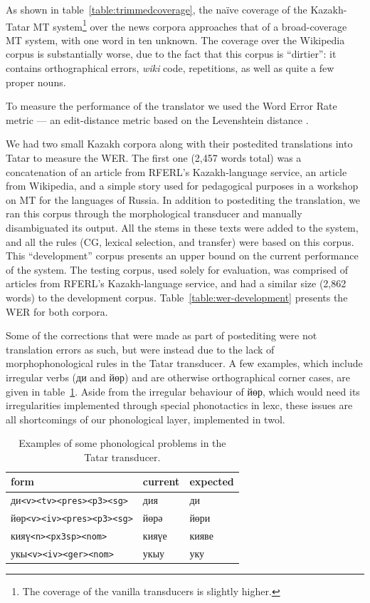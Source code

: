 \documentclass[a4paper,11pt]{article}
\newcommand{\tag}[1]{{\small{\texttt{#1}}}}
\begin{document}
As shown in table~\ref{table:trimmedcoverage}, the naïve coverage of the Kazakh-Tatar MT 
system\footnote{The coverage of the vanilla transducers is slightly higher.} over 
the news corpora approaches that of a broad-coverage MT system, with one word in ten unknown.
The coverage over the Wikipedia corpus 
is substantially worse, due to the fact that this corpus is ``dirtier'': it contains orthographical errors, \emph{wiki} code, repetitions, as well as quite a few proper nouns.

To measure the performance of the translator we used the Word Error Rate metric --- an edit-distance metric based on the
Levenshtein distance \citep{levenshtein/1966}.

We had two small Kazakh corpora along with their postedited translations into Tatar to measure the WER.
The first one (2,457 words total) was a concatenation of an article from RFERL's
Kazakh-language service, an article from Wikipedia, and a simple story used for pedagogical purposes in a workshop
on MT for the languages of Russia. In addition to postediting the translation, we ran this corpus through the
morphological transducer and manually disambiguated its output.  All the stems in these texts were added to
the system, and all the rules (CG, lexical selection, and transfer) were based on this corpus.
This ``development'' corpus presents an upper bound on the current performance
of the system. %
The testing corpus, used solely for evaluation, was comprised of articles from RFERL's Kazakh-language service, and had a similar size (2,862 words) to the development corpus.
Table~\ref{table:wer-development} presents the WER for both corpora. %

Some of the corrections that were made as part of postediting were not translation errors as such, but were instead due to the lack of morphophonological rules in the Tatar transducer.  A few examples, which include irregular verbs (ди and йөр) and are otherwise orthographical corner cases, are given in table~\ref{tab:phonerrors}.  Aside from the irregular behaviour of йөр, which would need its irregularities implemented through special phonotactics in lexc, these issues are all shortcomings of our phonological layer, implemented in twol.

\begin{table}
	\centering
	\begin{tabular}{lll}
		\toprule
		form & current & expected \\\midrule
		ди\tag{<v>}\tag{<tv>}\tag{<pres>}\tag{<p3>}\tag{<sg>} & дия & ди \\
		йөр\tag{<v>}\tag{<iv>}\tag{<pres>}\tag{<p3>}\tag{<sg>} & йөрә & йөри \\
		кияү\tag{<n>}\tag{<px3sp>}\tag{<nom>} & кияүе & кияве \\
		укы\tag{<v>}\tag{<iv>}\tag{<ger>}\tag{<nom>} & укыу & уку \\\bottomrule
	\end{tabular}
	\caption{Examples of some phonological problems in the Tatar transducer.}
	\label{tab:phonerrors}
\end{table}
\end{document}
